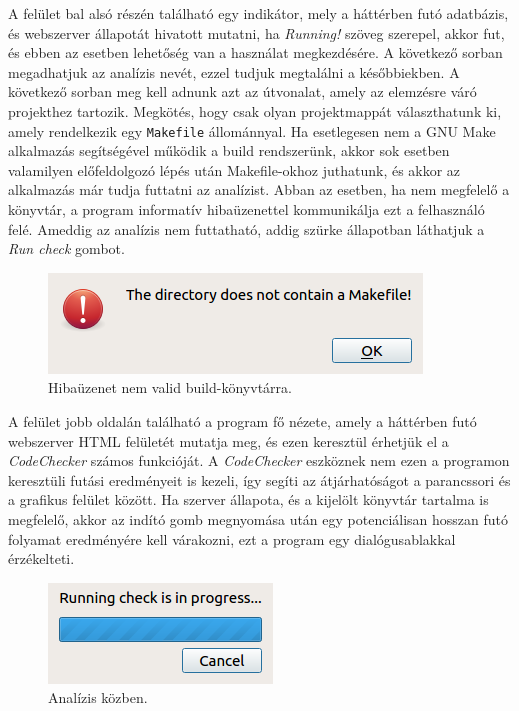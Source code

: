 \documentclass[a4paper,12pt]{report}
\begin{document}
A felület bal alsó részén található egy indikátor, mely a háttérben futó adatbázis, és webszerver állapotát hivatott mutatni, ha \emph{Running!} szöveg szerepel, akkor fut, és ebben az esetben lehetőség van a használat megkezdésére. A következő sorban megadhatjuk az analízis nevét, ezzel tudjuk megtalálni a későbbiekben. A következő sorban meg kell adnunk azt az útvonalat, amely az elemzésre váró projekthez tartozik. Megkötés, hogy csak olyan projektmappát választhatunk ki, amely rendelkezik egy \texttt{Makefile} állománnyal. Ha esetlegesen nem a GNU Make alkalmazás segítségével működik a build rendszerünk, akkor sok esetben valamilyen előfeldolgozó lépés után Makefile-okhoz juthatunk, és akkor az alkalmazás már tudja futtatni az analízist. Abban az esetben, ha nem megfelelő a könyvtár, a program informatív hibaüzenettel kommunikálja ezt a felhasználó felé. Ameddig az analízis nem futtatható, addig szürke állapotban láthatjuk a \emph{Run check} gombot.


\begin{figure}[h]
\caption{Hibaüzenet nem valid build-könyvtárra.}
\centering
\includegraphics[scale=0.8]{build_dir_error.png}
\end{figure}

A felület jobb oldalán található a program fő nézete, amely a háttérben futó webszerver HTML felületét mutatja meg, és ezen keresztül érhetjük el a \emph{CodeChecker} számos funkcióját. A \emph{CodeChecker} eszköznek nem ezen a programon keresztüli futási eredményeit is kezeli, így segíti az átjárhatóságot a parancssori és a grafikus felület között. Ha szerver állapota, és a kijelölt könyvtár tartalma is megfelelő, akkor az indító gomb megnyomása után egy potenciálisan hosszan futó folyamat eredményére kell várakozni, ezt a program egy dialógusablakkal érzékelteti.

\begin{figure}[h]
\caption{Analízis közben.}
\centering
\includegraphics[scale=0.8]{progress_bar.png}
\end{figure}
\end{document}
